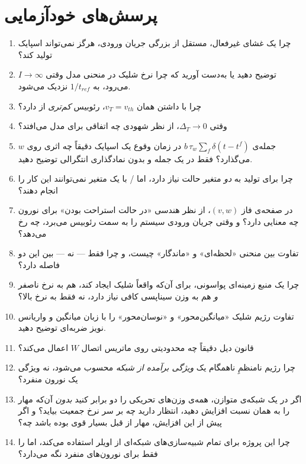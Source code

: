 \documentclass[11pt,a4paper]{article}
\begin{document}
\section{پرسش‌های خودآزمایی}
\begin{enumerate}[itemsep=6pt, leftmargin=1.6em]
	\item چرا یک غشای غیرفعال، مستقل از بزرگی جریان ورودی، هرگز نمی‌تواند اسپایک تولید کند؟
	\item توضیح دهید یا به‌دست آورید که چرا نرخ شلیک در منحنی  مدل  وقتی $I \to \infty$ می‌رود، به $1/t_{ref}$ نزدیک می‌شود.
	\item چرا  با داشتن همان $v_T = v_{th}$، رئوبیس \emph{کم‌تری} از  دارد؟
	\item وقتی $\Delta_T \to 0$، از نظر شهودی چه اتفاقی برای مدل  می‌افتد؟
	\item جمله‌ی
	$b\,\tau_w\sum_f \delta(t-t^f)$
	در زمان وقوع یک اسپایک دقیقاً چه اثری روی $w$ می‌گذارد؟ فقط در یک جمله و بدون نمادگذاری انتگرالی توضیح دهید.
	\item چرا  برای تولید  به \emph{دو} متغیر حالت نیاز دارد، اما / با یک متغیر نمی‌توانند این کار را انجام دهند؟
	\item در صفحه‌ی فاز $(v,w)$، از نظر هندسی «در حالت استراحت بودن» برای نورون چه معنایی دارد؟ و وقتی جریان ورودی سیستم را به سمت رئوبیس می‌برد، چه رخ می‌دهد؟
	\item تفاوت بین منحنی  «لحظه‌ای» و «ماندگار» چیست، و چرا فقط  — نه  — بین این دو فاصله دارد؟
	\item چرا یک منبع زمینه‌ای پواسونی، برای آن‌که واقعاً شلیک ایجاد کند، هم به نرخ ناصفر \emph{و} هم به وزن سیناپسی کافی نیاز دارد، نه فقط به نرخ بالا؟
	\item تفاوت رژیم شلیک «میانگین‌محور» و «نوسان‌محور» را با زبان میانگین و واریانس نویز ضربه‌ای توضیح دهید.
	\item قانون دیل دقیقاً چه محدودیتی روی ماتریس اتصال $W$ اعمال می‌کند؟
	\item چرا رژیم نامنظمِ ناهمگام  یک \emph{ویژگی برآمده از شبکه} محسوب می‌شود، نه ویژگی یک نورون منفرد؟
	\item اگر در یک شبکه‌ی متوازن، همه‌ی وزن‌های تحریکی را دو برابر کنید \emph{بدون} آن‌که مهار را به همان نسبت افزایش دهید، انتظار دارید چه بر سر نرخ جمعیت بیاید؟ و اگر پیش از این افزایش، مهار از قبل بسیار قوی بوده باشد چه؟
	\item چرا این پروژه برای تمام شبیه‌سازی‌های شبکه‌ای از اویلر استفاده می‌کند، اما  را فقط برای نورون‌های منفرد نگه می‌دارد؟
\end{enumerate}
\end{document}
